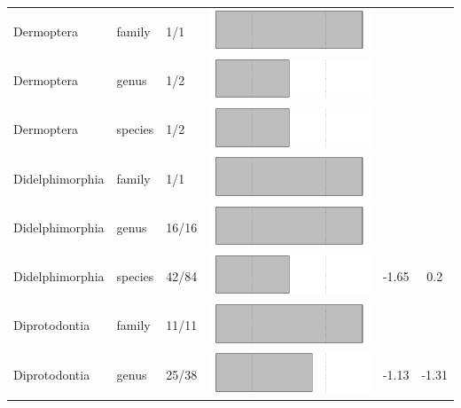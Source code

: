 \begin{longtable}{lL{1.8cm}C{2cm}lcc}
  Dermoptera & family & 1/1 & \includegraphics[width=0.20\linewidth, height=0.05\linewidth]{Supplementaries/Figures/Chapter2/Results_1c/Table_figures/bar19.pdf} &   &   \\ 
  Dermoptera & genus & 1/2 & \includegraphics[width=0.20\linewidth, height=0.05\linewidth]{Supplementaries/Figures/Chapter2/Results_1c/Table_figures/bar20.pdf} &   &   \\ 
  Dermoptera & species & 1/2 & \includegraphics[width=0.20\linewidth, height=0.05\linewidth]{Supplementaries/Figures/Chapter2/Results_1c/Table_figures/bar21.pdf} &   &   \\ 
  Didelphimorphia & family & 1/1 & \includegraphics[width=0.20\linewidth, height=0.05\linewidth]{Supplementaries/Figures/Chapter2/Results_1c/Table_figures/bar22.pdf} &   &   \\ 
  Didelphimorphia & genus & 16/16 & \includegraphics[width=0.20\linewidth, height=0.05\linewidth]{Supplementaries/Figures/Chapter2/Results_1c/Table_figures/bar23.pdf} &   &   \\ 
  Didelphimorphia & species & 42/84 & \includegraphics[width=0.20\linewidth, height=0.05\linewidth]{Supplementaries/Figures/Chapter2/Results_1c/Table_figures/bar24.pdf} & -1.65 & 0.2 \\ 
  Diprotodontia & family & 11/11 & \includegraphics[width=0.20\linewidth, height=0.05\linewidth]{Supplementaries/Figures/Chapter2/Results_1c/Table_figures/bar25.pdf} &   &   \\ 
  Diprotodontia & genus & 25/38 & \includegraphics[width=0.20\linewidth, height=0.05\linewidth]{Supplementaries/Figures/Chapter2/Results_1c/Table_figures/bar26.pdf} & -1.13 & -1.31 \\ 

\end{longtable}
